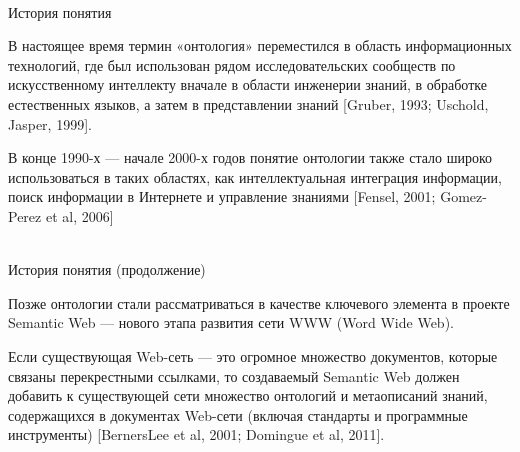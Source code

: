 \begin{frame}{\\История понятия}
	\topline
	\justifying
	
	\vspace{10mm}
	
	В настоящее время термин «онтология» переместился в область информационных технологий, где был использован рядом исследовательских сообществ по искусственному интеллекту вначале в области инженерии знаний, в обработке естественных языков, а затем в представлении знаний [Gruber, 1993; Uschold, Jasper, 1999].
	
	\vspace{0.5em}
	
	В конце 1990-х --- начале 2000-х годов понятие онтологии также стало широко использоваться в таких областях, как интеллектуальная интеграция информации, поиск информации в Интернете и управление знаниями [Fensel, 2001; Gomez-Perez et al, 2006]
	
\end{frame}

\begin{frame}{\\История понятия (продолжение)}
	\topline
	\justifying
	
	Позже онтологии стали рассматриваться в качестве ключевого элемента в проекте Semantic Web --- нового этапа развития сети WWW (Word Wide Web).
	
	\vspace{1em}
	
	Если существующая Web-сеть --- это огромное множество документов, которые связаны перекрестными ссылками, то создаваемый Semantic Web должен добавить к существующей сети множество онтологий и метаописаний знаний, содержащихся в документах Web-сети (включая стандарты и программные инструменты) [BernersLee et al, 2001; Domingue et al, 2011].
	
\end{frame}


